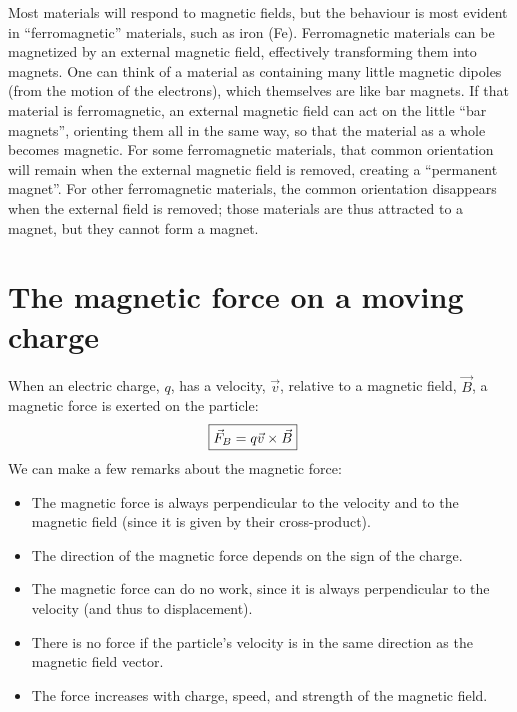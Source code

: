 Most materials will respond to magnetic fields, but the behaviour is most evident in ``ferromagnetic'' materials, such as iron (Fe). Ferromagnetic materials can be magnetized by an external magnetic field, effectively transforming them into magnets. One can think of a material as containing many little magnetic dipoles (from the motion of the electrons), which themselves are like bar magnets. If that material is ferromagnetic,  an external magnetic field can act on the little ``bar magnets'', orienting them all in the same way, so that the material as a whole becomes magnetic. For some ferromagnetic materials, that common orientation will remain when the external magnetic field is removed, creating a ``permanent magnet''. For other ferromagnetic materials, the common orientation disappears when the external field is removed; those materials are thus attracted to a magnet, but they cannot form a magnet. 
  
\section{The magnetic force on a moving charge}
When an electric charge, $q$, has a velocity, $\vec v$, relative to a magnetic field, $\vec B$, a magnetic force is exerted on the particle:
\begin{align*}
\Aboxed{\vec F_B = q \vec v \times \vec B}
\end{align*}
We can make a few remarks about the magnetic force:
\begin{itemize}
\item The magnetic force is always perpendicular to the velocity and to the magnetic field (since it is given by their cross-product).
\item The direction of the magnetic force depends on the sign of the charge.
\item The magnetic force can do no work, since it is always perpendicular to the velocity (and thus to displacement).
\item There is no force if the particle's velocity is in the same direction as the magnetic field vector. 
\item The force increases with charge, speed, and strength of the magnetic field.
\end{itemize}

